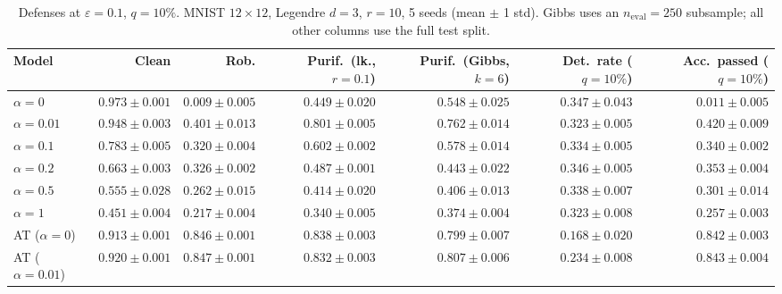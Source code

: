 \begin{table}[htbp]
  \centering
  \small
  \begin{tabular}{@{}lrrrrrr@{}}
    \toprule
    Model & Clean & Rob. & Purif.\ (lk., $r{=}0.1$) & Purif.\ (Gibbs, $k{=}6$) & Det.\ rate ($q{=}10\%$) & Acc.\ passed ($q{=}10\%$) \\
    \midrule
    $\alpha{=}0$ & $\mathbf{0.973 \pm 0.001}$ & $0.009 \pm 0.005$ & $0.449 \pm 0.020$ & $0.548 \pm 0.025$ & $\mathbf{0.347 \pm 0.043}$ & $0.011 \pm 0.005$ \\
    $\alpha{=}0.01$ & $0.948 \pm 0.003$ & $0.401 \pm 0.013$ & $0.801 \pm 0.005$ & $0.762 \pm 0.014$ & $0.323 \pm 0.005$ & $0.420 \pm 0.009$ \\
    $\alpha{=}0.1$ & $0.783 \pm 0.005$ & $0.320 \pm 0.004$ & $0.602 \pm 0.002$ & $0.578 \pm 0.014$ & $0.334 \pm 0.005$ & $0.340 \pm 0.002$ \\
    $\alpha{=}0.2$ & $0.663 \pm 0.003$ & $0.326 \pm 0.002$ & $0.487 \pm 0.001$ & $0.443 \pm 0.022$ & $0.346 \pm 0.005$ & $0.353 \pm 0.004$ \\
    $\alpha{=}0.5$ & $0.555 \pm 0.028$ & $0.262 \pm 0.015$ & $0.414 \pm 0.020$ & $0.406 \pm 0.013$ & $0.338 \pm 0.007$ & $0.301 \pm 0.014$ \\
    $\alpha{=}1$ & $0.451 \pm 0.004$ & $0.217 \pm 0.004$ & $0.340 \pm 0.005$ & $0.374 \pm 0.004$ & $0.323 \pm 0.008$ & $0.257 \pm 0.003$ \\
    AT ($\alpha{=}0$) & $0.913 \pm 0.001$ & $0.846 \pm 0.001$ & $\mathbf{0.838 \pm 0.003}$ & $0.799 \pm 0.007$ & $0.168 \pm 0.020$ & $0.842 \pm 0.003$ \\
    AT ($\alpha{=}0.01$) & $0.920 \pm 0.001$ & $\mathbf{0.847 \pm 0.001}$ & $0.832 \pm 0.003$ & $\mathbf{0.807 \pm 0.006}$ & $0.234 \pm 0.008$ & $\mathbf{0.843 \pm 0.004}$ \\
    \bottomrule
  \end{tabular}
  \caption{Defenses at $\varepsilon=0.1$, $q{=}10\%$. MNIST $12\times12$, Legendre $d{=}3$, $r{=}10$, 5 seeds (mean $\pm$ 1 std). Gibbs uses an $n_{\mathrm{eval}}=250$ subsample; all other columns use the full test split.}
  \label{tab:mnist_r12_models_r10_eps0.1}
\end{table}
